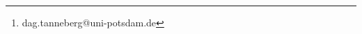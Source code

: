 \usepackage{graphicx}
\usepackage{booktabs}
\usepackage{caption}
\author{Dag Tanneberg\thanks{dag.tanneberg@uni-potsdam.de}}
